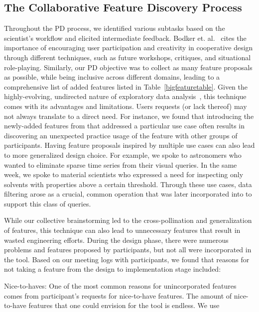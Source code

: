 {  \subsection{The Collaborative Feature Discovery Process}
  \par Throughout the PD process, we identified various subtasks based on the scientist's workflow and elicited intermediate feedback.
  Bodker et. al.~\cite{BodkerGronbaek} cites the importance of encouraging user participation and creativity in cooperative design through different techniques, such as future workshops, critiques, and situational role-playing. Similarly, our PD objective was to collect as many feature proposals as possible, while being inclusive across different domains, leading to a comprehensive list of added features listed in Table~\ref{bigfeaturetable}. Given the highly-evolving, undirected nature of exploratory data analysis~\cite{Keim2006,Tukey1970}, this technique comes with its advantages and limitations. Users requests (or lack thereof) may not always translate to a direct need. For instance, we found that introducing the newly-added features from \zvpp that addressed a particular use case often results in discovering an unexpected practice usage of the feature with other groups of participants. Having feature proposals inspired by multiple use cases can also lead to more generalized design choice. For example, we spoke to astronomers who wanted to eliminate sparse time series from their visual queries. In the same week, we spoke to material scientists who expressed a need for inspecting only solvents with properties above a certain threshold. Through these use cases, data filtering arose as a crucial, common operation that was later incorporated into \zvpp to support this class of queries.
  \par While our collective brainstorming led to the cross-pollination and generalization of features, this technique can also lead to unnecessary features that result in wasted engineering efforts. During the design phase, there were numerous problems and features proposed by participants, but not all were incorporated in the tool. Based on our meeting logs with participants, we found that reasons for not taking a feature from the design to implementation stage included:
  \begin{denselist}
  \item Nice-to-haves: One of the most common reasons for unincorporated features comes from participant's requests for nice-to-have features. The amount of nice-to-have features that one could envision for the tool is endless. We use

\end{denselist}}
